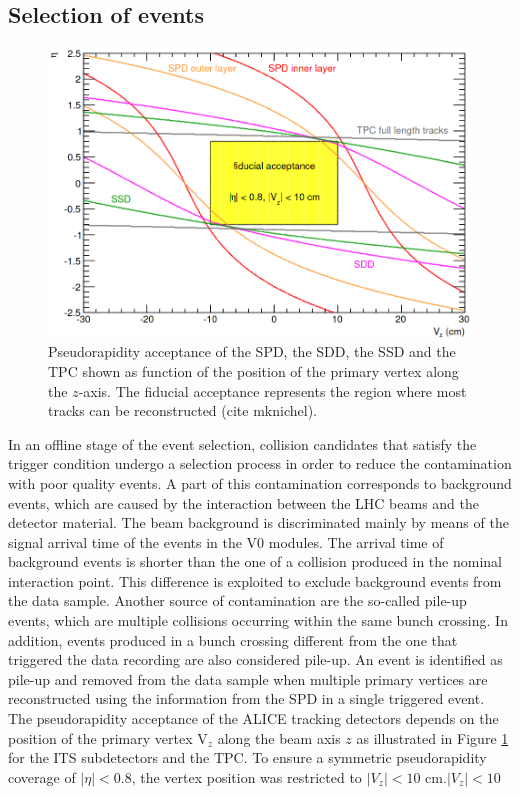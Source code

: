 \documentclass[12pt,a4paper]{report}
\begin{document}
\subsection{Selection of events}
\begin{figure}[tb!]
\centering
\includegraphics[width=12cm]{Plots/fiducialAcc.png}  
\caption{Pseudorapidity acceptance of the SPD, the SDD, the SSD and the TPC shown as function of the position of the primary vertex along the $z$-axis. The fiducial acceptance represents the region where most tracks can be reconstructed (cite mknichel).}
\label{fiducialAcc}
\end{figure}
In an offline stage of the event selection, collision candidates that satisfy the trigger condition undergo a selection process in order to reduce the contamination with poor quality events. A part of this contamination corresponds to background events, which are caused by the interaction between the LHC beams and the detector material. The beam background is discriminated mainly by means of the signal arrival time of the events in the V0 modules. The arrival time of background events is shorter than the one of a collision produced in the nominal interaction point. This difference is exploited to exclude background events from the data sample. Another source of contamination are the so-called pile-up events, which are multiple collisions occurring within the same bunch crossing. In addition, events produced in a bunch crossing different from the one that triggered the data recording are also considered pile-up. An event is identified as pile-up and removed from the data sample when multiple primary vertices are reconstructed using the information from the SPD in a single triggered event.\\
The pseudorapidity acceptance of the ALICE tracking detectors depends on the position of the primary vertex $\text{V}_z$ along the beam axis $z$ as illustrated in Figure \ref{fiducialAcc} for the ITS subdetectors and the TPC. To ensure a symmetric pseudorapidity  coverage of $|\eta| < 0.8$, the vertex position was restricted to $|V_z| < 10$ cm.$|V_z| < 10$ 
\end{document}

